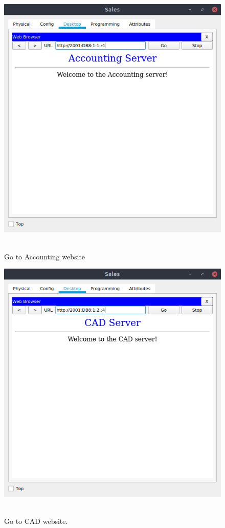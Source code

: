 \documentclass[conference]{IEEEtran}
\begin{document}
\begin{center}
\begin{figure}[h]
\includegraphics[scale=0.45]{resources/q41.png}\
\caption{Go to Accounting website}
\label{browser_sales1}
\end{figure}
\end{center}

\begin{center}
\begin{figure}[h]
\includegraphics[scale=0.45]{resources/q42.png}\
\caption{Go to CAD website.}
\label{browser_sales2}
\end{figure}
\end{center}
\end{document}
